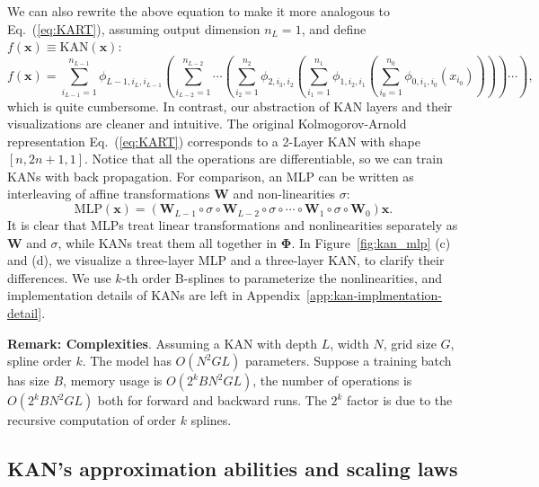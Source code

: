 \documentclass[12pt]{caltech_thesis}
\numberwithin{equation}{section}
\begin{document}
We can also rewrite the above equation to make it more analogous to Eq.~(\ref{eq:KART}), assuming output dimension $n_{L}=1$, and define $f(\mathbf{x})\equiv {\text{KAN}}(\mathbf{x})$:
\begin{equation}
    f(\mathbf{x})=\sum_{i_{L-1}=1}^{n_{L-1}}\phi_{L-1,i_{L},i_{L-1}}\left(\sum_{i_{L-2}=1}^{n_{L-2}}\cdots\left(\sum_{i_2=1}^{n_2}\phi_{2,i_3,i_2}\left(\sum_{i_1=1}^{n_1}\phi_{1,i_2,i_1}\left(\sum_{i_0=1}^{n_0}\phi_{0,i_1,i_0}(x_{i_0})\right)\right)\right)\cdots\right),
\end{equation}
which is quite cumbersome. In contrast, our abstraction of KAN layers and their visualizations are cleaner and intuitive. The original Kolmogorov-Arnold representation Eq.~(\ref{eq:KART}) corresponds to a 2-Layer KAN with shape $[n,2n+1,1]$. Notice that all the operations are differentiable, so we can train KANs with back propagation. For comparison, an MLP can be written as interleaving of affine transformations $\mathbf{W}$ and non-linearities $\sigma$:
\begin{equation}
    {\text{MLP}}(\mathbf{x}) = (\mathbf{W}_{L-1}\circ\sigma\circ \mathbf{W}_{L-2}\circ\sigma\circ\cdots\circ\mathbf{W}_1\circ\sigma\circ\mathbf{W}_0)\mathbf{x}.
\end{equation}
It is clear that MLPs treat linear transformations and nonlinearities separately as $\mathbf{W}$ and $\sigma$, while KANs treat them all together in $\mathbf{\Phi}$. In Figure~\ref{fig:kan_mlp} (c) and (d), we visualize a three-layer MLP and a three-layer KAN, to clarify their differences. We use $k$-th order B-splines to parameterize the nonlinearities, and implementation details of KANs are left in Appendix~\ref{app:kan-implmentation-detail}.

{\textbf{Remark: Complexities}}. Assuming a KAN with depth $L$, width $N$, grid size $G$, spline order $k$. The model has $O(N^2GL)$ parameters. Suppose a training batch has size $B$, memory usage is $O(2^kBN^2GL)$, the number of operations is $O(2^kBN^2GL)$ both for forward and backward runs. The $2^k$ factor is due to the recursive computation of order $k$ splines.

\subsection{KAN's approximation abilities and scaling laws}\label{subsec:kan_scaling_theory}
\end{document}
